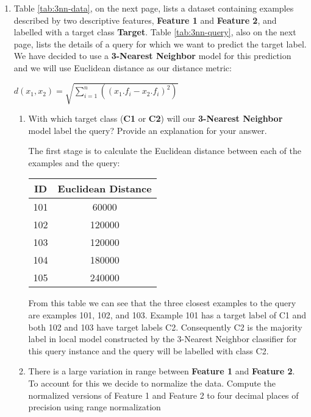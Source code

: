 \documentclass[nosolution]{ditpaper}
\begin{document}
\clearpage

\question 
	\begin{enumerate}	
		\item Table \ref{tab:3nn-data}, on the next page, lists a dataset containing examples described by two descriptive features, \textbf{Feature 1} and \textbf{Feature 2}, and labelled with a target class \textbf{Target}. Table \ref{tab:3nn-query}, also on the next page, lists the details of a query for which we want to predict the target label. We have decided to use a \textbf{3-Nearest Neighbor} model for this prediction and we will use Euclidean distance as our distance metric: 
								\begin{center}
								$d(x_1,x_2)=\sqrt{\sum_{i=1}^{n} \left(\left(x_1.f_i - x_2.f_i \right)^2 \right)}$
								\end{center}					
		\begin{enumerate}
				\item With which target class (\textbf{C1}  or \textbf{C2}) will our \textbf{3-Nearest Neighbor} model label the query? Provide an explanation for your answer.				
				\begin{answer}
					The first stage is to calculate the Euclidean distance between each of the examples and the query:
					\begin{center}
						\begin{tabular}{|c|c|}
						ID & Euclidean Distance \\
						\hline
						101 & 60000\\
						102 & 120000\\
						103 & 120000\\
						104 & 180000\\
						105 & 240000\\
						\hline
						\end{tabular}
					\end{center}
				 From this table we can see that the three closest examples to the query are examples 101, 102, and 103. Example 101 has a target label of C1 and both 102 and 103 have target labels C2. Consequently C2 is the majority label in local model constructed by the 3-Nearest Neighbor classifier for this query instance and the query will be labelled with class C2.
				\end{answer}
			\item There is a large variation in range between \textbf{Feature 1} and \textbf{Feature 2}. To account for this we decide to normalize the data. Compute the normalized versions of Feature 1 and Feature 2  to four decimal places of precision using range normalization 

\end{enumerate}
\end{enumerate}
\end{document}

